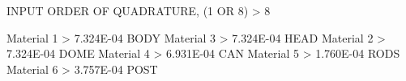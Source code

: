 INPUT ORDER OF QUADRATURE, (1 OR 8) > 8

  Material  1 > 7.324E-04  BODY
  Material  3 > 7.324E-04  HEAD
  Material  2 > 7.324E-04  DOME
  Material  4 > 6.931E-04  CAN
  Material  5 > 1.760E-04  RODS
  Material  6 > 3.757E-04  POST
